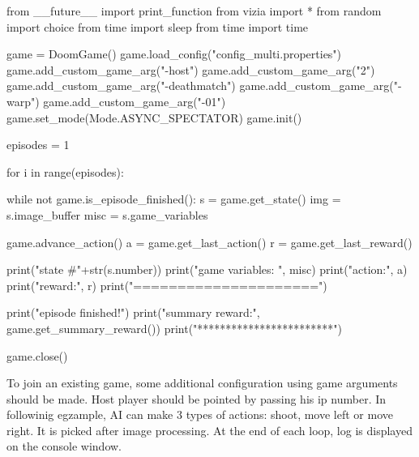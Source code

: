 \begin{pblock}
from __future__ import print_function
from vizia import *
from random import choice
from time import sleep
from time import time

game = DoomGame()
game.load_config("config_multi.properties")
game.add_custom_game_arg("-host")
game.add_custom_game_arg("2")
game.add_custom_game_arg("-deathmatch")
game.add_custom_game_arg("-warp")
game.add_custom_game_arg("-01")
game.set_mode(Mode.ASYNC_SPECTATOR)
game.init()

	
episodes = 1

for i in range(episodes):
	
	while not game.is_episode_finished():	
		s = game.get_state()
		img = s.image_buffer
		misc = s.game_variables

		game.advance_action()
		a = game.get_last_action()
		r = game.get_last_reward()
			
		print("state #"+str(s.number))
		print("game variables: ", misc)
		print("action:", a)
		print("reward:", r)
		print("=====================")
	
print("episode finished!")
print("summary reward:", game.get_summary_reward())
print("************************")

game.close()
\end{pblock}


	To join an existing game, some additional configuration using game arguments should be made. Host player should be pointed by passing his ip number. In followinig egzample, AI can make 3 types of actions: shoot, move left or move right. It is picked after image processing. At the end of each loop, log is displayed on the console window.

